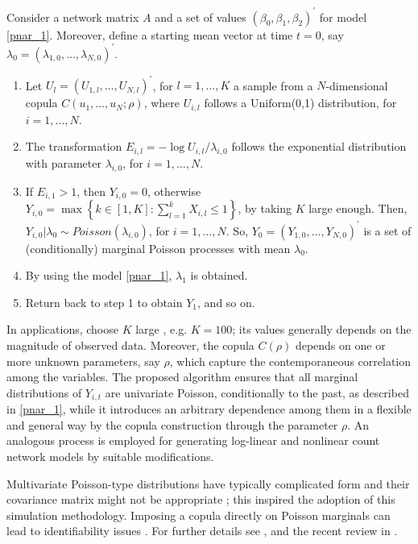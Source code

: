 Consider a network matrix $A$ and a set of values $(\beta_0,\beta_1, \beta_2)^\prime$ for model \eqref{pnar_1}. Moreover, define a starting mean vector at time $t=0$, say $\lambda_0=(\lambda_{1,0},\dots,\lambda_{N,0})^\prime$.
\begin{enumerate}	
	\item Let $U_{l}=(U_{1,l},\dots,U_{N,l})^\prime$, for $l=1,\dots,K$ a sample from a $N$-dimensional copula $C(u_1,\dots, u_N; \rho)$, where $U_{i,l}$ follows a Uniform(0,1) distribution, for $i=1,\dots, N$.
	\item The transformation $E_{i,l}=-\log{U_{i,l}}/\lambda_{i,0}$  follows the exponential distribution  with parameter $\lambda_{i,0}$, for $i=1,\dots, N$.
	\item If $E_{i,1}>1$, then $Y_{i,0}=0$, otherwise 
	$Y_{i,0}=\max\left\lbrace k\in[1,K]:  \sum_{l=1}^{k}X_{i,l}\leq 1\right\rbrace$, by taking $K$ large enough.
	Then, $Y_{i,0}|\lambda_0 \sim Poisson(\lambda_{i,0})$, for $i=1,\dots, N$. So, $Y_{0}=(Y_{1,0},\dots, Y_{N,0})^\prime$ is a set of (conditionally) marginal Poisson processes with mean $\lambda_0$. 
	\item By using the model \eqref{pnar_1}, $\lambda_1$ is obtained.
	\item Return back to step 1 to obtain $Y_1$, and so on.
\end{enumerate}
In  applications, choose  $K$ large , e.g. $K=100$; its values generally depends on the magnitude of observed data. Moreover, the copula
$C(\rho)$ depends on one or more unknown parameters, say $\rho$, which capture the contemporaneous correlation among the variables. The proposed algorithm ensures that all marginal distributions of $Y_{i,t}$ are univariate Poisson, conditionally to the past, as described in \eqref{pnar_1}, while it introduces an arbitrary
dependence among them in a flexible and general way by the copula construction through the parameter $\rho$. An analogous process is employed for generating log-linear and nonlinear count network models by suitable modifications. 

Multivariate Poisson-type distributions have typically complicated form and their  covariance matrix might not be appropriate  \citep{fok2020}; this inspired the adoption of this simulation methodology. Imposing a copula  directly on Poisson marginals can lead to identifiability issues \citep{GenestandNeslehova(2007)}.  For further details see \cite{fok2020}, \cite{armillotta_fokianos_2021} and the recent review in \cite{fokianos_2021}.

